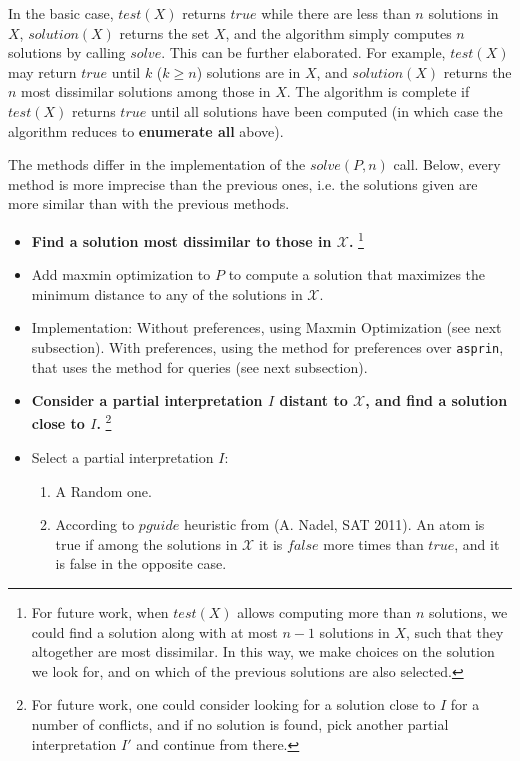 \documentclass[a4paper,10pt]{article}
\begin{document}
In the basic case,  
$test(X)$ returns $true$ while there are less than $n$ solutions in $X$, 
$solution(X)$ returns the set $X$,
and the algorithm simply computes $n$ solutions by calling $solve$.
This can be further elaborated. 
For example, $test(X)$ may return $true$ until $k$ ($k \geq n$) solutions are in $X$, 
and $solution(X)$ returns the $n$ most dissimilar solutions among those in $X$.
The algorithm is complete if $test(X)$ returns $true$ until all solutions have been computed
(in which case the algorithm reduces to \textbf{enumerate all} above).

The methods differ in the implementation of the $solve(P,n)$ call.
Below, every method is more imprecise than the previous ones, 
i.e. the solutions given are more similar than with the previous methods.

\begin{itemize}
\item
\textbf{Find a solution most dissimilar to those in $\mathcal{X}$.}
\footnote{
For future work, when $test(X)$ allows computing more than $n$ solutions, 
we could find a solution along with at most $n-1$ solutions in $X$, such that they altogether are most dissimilar.
In this way, we make choices on the solution we look for, 
and on which of the previous solutions are also selected.
}
\item
Add maxmin optimization to $P$ to 
compute a solution that maximizes the minimum distance to any of the solutions in $\mathcal{X}$.
\item
Implementation: 
Without preferences, using Maxmin Optimization (see next subsection).
With preferences, using the method for preferences over \texttt{asprin}, 
that uses the method for queries (see next subsection). 
\item
\textbf{Consider a partial interpretation $I$ distant to $\mathcal{X}$, and find a solution close to $I$.}
\footnote{
For future work, one could consider looking for a solution close to $I$ for a number of conflicts, 
and if no solution is found, pick another partial interpretation $I'$ and continue from there.
}
\item
Select a partial interpretation $I$:
\begin{enumerate}
    \item
    A Random one.
    \item
    According to $pguide$ heuristic from (A. Nadel, SAT 2011).
    An atom is true if among the solutions in $\mathcal{X}$ it is $false$ more times than $true$, 
    and it is false in the opposite case. 

\end{enumerate}
\end{itemize}
\end{document}
